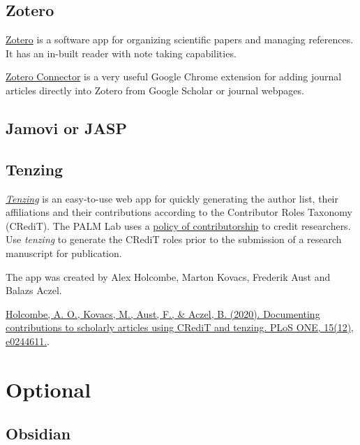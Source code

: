 \documentclass[
]{book}
\begin{document}
\hypertarget{zotero}{%
\subsection*{Zotero}\label{zotero}}

\href{https://www.zotero.org/}{Zotero} is a software app for organizing scientific papers and managing references. It has an in-built reader with note taking capabilities.

\href{https://www.zotero.org/download/connectors}{Zotero Connector} is a very useful Google Chrome extension for adding journal articles directly into Zotero from Google Scholar or journal webpages.

\hypertarget{jamovi-or-jasp}{%
\subsection*{Jamovi or JASP}\label{jamovi-or-jasp}}

\hypertarget{tenzing}{%
\subsection*{Tenzing}\label{tenzing}}

\href{https://tenzing.club}{\emph{Tenzing}} is an easy-to-use web app for quickly generating the author list, their affiliations and their contributions according to the Contributor Roles Taxonomy (CRediT). The PALM Lab uses a \protect\hyperlink{contributorship}{policy of contributorship} to credit researchers. Use \emph{tenzing} to generate the CRediT roles prior to the submission of a research manuscript for publication.

The app was created by Alex Holcombe, Marton Kovacs, Frederik Aust and Balazs Aczel.

\href{https://journals.plos.org/plosone/article?id=10.1371/journal.pone.0244611}{Holcombe, A. O., Kovacs, M., Aust, F., \& Aczel, B. (2020). Documenting contributions to scholarly articles using CRediT and tenzing. PLoS ONE, 15(12), e0244611.}.

\hypertarget{optional}{%
\section{Optional}\label{optional}}

\hypertarget{obsidian}{%
\subsection*{Obsidian}\label{obsidian}}
\end{document}
